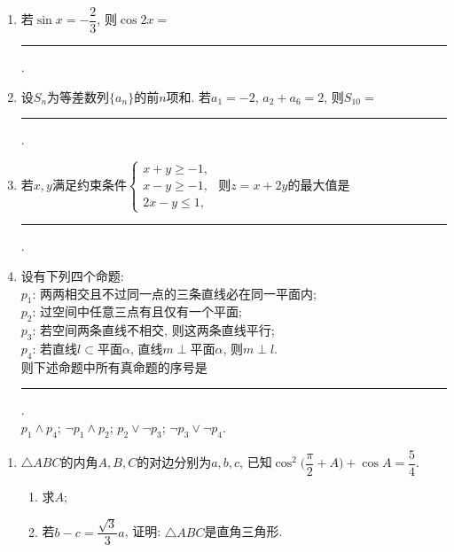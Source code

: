 \begin{description}
\begin{enumerate}[leftmargin=5pt]
    \end{enumerate}
    
    \item[二、填空题]
    \begin{enumerate}[leftmargin=5pt]
      \addtocounter{enumi}{+12}
        \item 若$\sin x=-\dfrac{2}{3}$, 则$\cos 2x=$ \rule[-0.3ex]{3em}{0.4pt}.
        \item 设$S_n$为等差数列$\{a_n\}$的前$n$项和. 若$a_1=-2$, $a_2+a_6=2$, 则$S_{10}=$ \rule[-0.3ex]{3em}{0.4pt}.
        \item 若$x,y$满足约束条件$\begin{cases}x+y\geqslant -1,\\x-y\geqslant -1,\\2x-y\leqslant 1,\end{cases}$ 则$z=x+2y$的最大值是 \rule[-0.3ex]{3em}{0.4pt}.
        \item 设有下列四个命题:\\
        $p_1$: 两两相交且不过同一点的三条直线必在同一平面内;\\
        $p_2$: 过空间中任意三点有且仅有一个平面;\\
        $p_3$: 若空间两条直线不相交, 则这两条直线平行;\\
        $p_4$: 若直线$l\subset$平面$\alpha$, 直线$m\perp$平面$\alpha$, 则$m\perp l$.\\
        则下述命题中所有真命题的序号是 \rule[-0.3ex]{3em}{0.4pt}.\\
         $p_1\land p_4$; \quad {} $\neg p_1\land p_2$; \quad {} $p_2\lor\neg p_3$; \quad {} $\neg p_3\lor\neg p_4$.
    \end{enumerate}
    
    \item[三、解答题]
    \begin{enumerate}[leftmargin=5pt]
      \addtocounter{enumi}{+16}
        \item $\triangle ABC$的内角$A,B,C$的对边分别为$a,b,c$, 已知$\cos^{2}\bigl(\dfrac{\pi}{2}+A\bigr)+\cos A=\dfrac{5}{4}$.
        \begin{enumerate}[label=(\arabic*)]
            \item 求$A$;
            \item 若$b-c=\dfrac{\sqrt{3}}{3}a$, 证明: $\triangle ABC$是直角三角形.
        \end{enumerate}


\end{enumerate}
\end{description}
